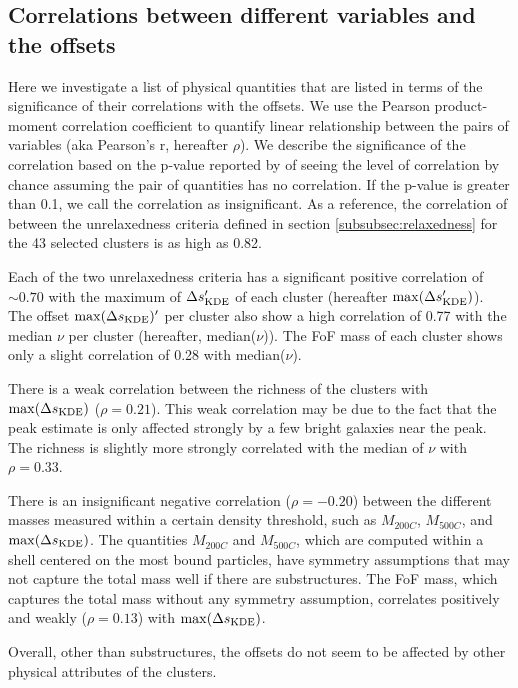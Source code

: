 \subsection{Correlations between different variables and the offsets}

Here we investigate a list of physical quantities that are listed in terms of
the significance of their correlations with the offsets. 
We use the Pearson product-moment correlation coefficient to quantify linear 
relationship between the pairs of variables
(aka Pearson's r,  hereafter $\rho$).
We describe the significance of the correlation 
based on the p-value reported by {} of seeing the level of 
correlation by chance assuming the pair of 
quantities has no correlation. If the p-value is greater than 0.1, we call the
correlation as insignificant.
As a reference, the correlation of between the 
unrelaxedness criteria defined in section \ref{subsubsec:relaxedness}
for the 43 selected clusters is as high as 0.82. 

Each of the two unrelaxedness criteria has a significant positive correlation of $\sim 0.70$
with the maximum of $\Delta s_{\rm KDE}'$ of each cluster
(hereafter $\max(\Delta s_{\rm KDE}')$).
The offset $\max(\Delta s_{\rm KDE})'$ per cluster also show a high
correlation of 0.77 with the median $\nu$ per cluster (hereafter,
median($\nu$)). The FoF mass of each cluster shows only a slight correlation of 0.28 with 
 median($\nu$).

There is a weak correlation between the richness of the
clusters with $\max(\Delta s_{\rm KDE})$ ($\rho = 0.21$). This weak correlation 
may be due to 
the fact that the peak estimate is only affected strongly by a few bright galaxies near 
the peak. The richness is slightly more strongly correlated with the median of $\nu$ 
with $\rho = 0.33$. 

There is an insignificant negative correlation ($\rho = -0.20$) between the 
different masses 
measured within a certain density threshold, such as $M_{200C}$, $M_{500C}$, 
and $\max(\Delta s_{\rm KDE})$. The quantities $M_{200C}$ and $M_{500C}$, which
are computed within a shell centered on the most bound particles, have
symmetry assumptions that may not capture the total mass well if there are substructures. 
The FoF mass, which
captures the total mass without any symmetry assumption, correlates positively
and weakly 
($\rho = 0.13$) with $\max(\Delta s_{\rm KDE})$. 

Overall, other than substructures, the offsets do not seem to be affected by
other physical attributes of the clusters.

